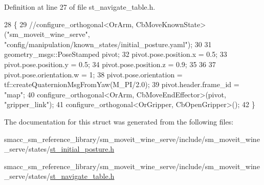 Definition at line 27 of file st\+\_\+navigate\+\_\+table.\+h.


\begin{DoxyCode}
28         \{
29             \textcolor{comment}{//configure\_orthogonal<OrArm, CbMoveKnownState>("sm\_moveit\_wine\_serve",
       "config/manipulation/known\_states/initial\_posture.yaml");}
30 
31             geometry\_msgs::PoseStamped pivot;
32             pivot.pose.position.x = 0.5;
33             pivot.pose.position.y = 0.5;
34             pivot.pose.position.z = 0.9;
35             
36             
37             pivot.pose.orientation.w = 1;
38             pivot.pose.orientation = tf::createQuaternionMsgFromYaw(M\_PI/2.0);
39             pivot.header.frame\_id = \textcolor{stringliteral}{"map"};
40             configure\_orthogonal<OrArm, CbMoveEndEffector>(pivot, \textcolor{stringliteral}{"gripper\_link"});
41             configure\_orthogonal<OrGripper, CbOpenGripper>();
42         \}
\end{DoxyCode}


The documentation for this struct was generated from the following files\+:\begin{DoxyCompactItemize}
\item 
smacc\+\_\+sm\+\_\+reference\+\_\+library/sm\+\_\+moveit\+\_\+wine\+\_\+serve/include/sm\+\_\+moveit\+\_\+wine\+\_\+serve/states/\hyperlink{sm__moveit__wine__serve_2include_2sm__moveit__wine__serve_2states_2st__initial__posture_8h}{st\+\_\+initial\+\_\+posture.\+h}\item 
smacc\+\_\+sm\+\_\+reference\+\_\+library/sm\+\_\+moveit\+\_\+wine\+\_\+serve/include/sm\+\_\+moveit\+\_\+wine\+\_\+serve/states/\hyperlink{st__navigate__table_8h}{st\+\_\+navigate\+\_\+table.\+h}\end{DoxyCompactItemize}
